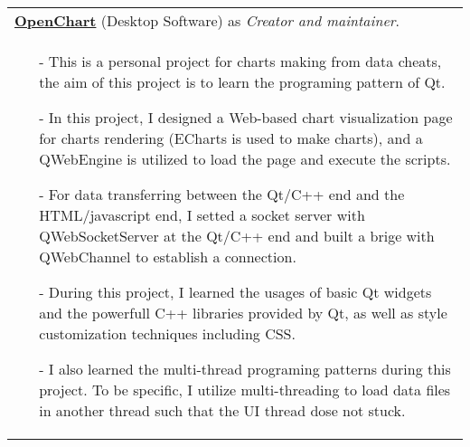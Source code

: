 \documentclass[a4paper,12pt]{article}
\newcommand{\signed}[1]{%
\unskip\nobreak\hfil\penalty50
   \hskip2em\hbox{}\nobreak\hfil#1
   \parfillskip=0pt \finalhyphendemerits=0 }
\begin{document}
\begin{tabularx}{\linewidth}{ @{}X@{} }
    \href{https://github.com/leonezz/OpenChart.git}{\textbf{OpenChart}} (Desktop Software) as \textit{Creator and maintainer}.
    \signed{Jun. 2019 - Dec. 2019} \\[3.75pt]
    \begin{minipage}[t]{\linewidth}
        \begin{itemize}[nosep,after=\strut, leftmargin=1em, itemsep=3pt]
            \item[-] This is a personal project for charts making from data cheats, the aim of this project is to learn the programing pattern of Qt.
            \item[-] In this project, I designed a Web-based chart visualization page for charts rendering (ECharts is used to make charts),
            and a QWebEngine is utilized to load the page and execute the scripts.
            \item[-] For data transferring between the Qt/C++ end and the HTML/javascript end, I setted a socket server with QWebSocketServer
            at the Qt/C++ end and built a brige with QWebChannel to establish a connection.
            \item[-] During this project, I learned the usages of basic Qt widgets and the powerfull C++ libraries provided by Qt,
            as well as style customization techniques including CSS.
            \item[-] I also learned the multi-thread programing patterns during this project. To be specific,
            I utilize multi-threading to load data files in another thread such that the UI thread dose not stuck.
        \end{itemize}
        \end{minipage}
\end{tabularx}
\end{document}
